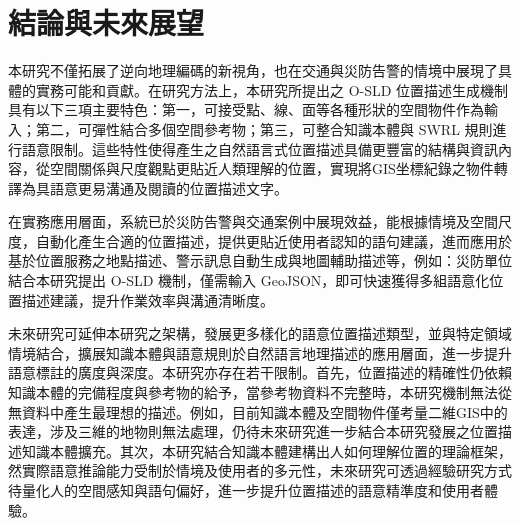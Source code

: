
\chapter{結論與未來展望}

本研究不僅拓展了逆向地理編碼的新視角，也在交通與災防告警的情境中展現了具體的實務可能和貢獻。在研究方法上，本研究所提出之 O-SLD 位置描述生成機制具有以下三項主要特色：第一，可接受點、線、面等各種形狀的空間物件作為輸入；第二，可彈性結合多個空間參考物；第三，可整合知識本體與 SWRL 規則進行語意限制。這些特性使得產生之自然語言式位置描述具備更豐富的結構與資訊內容，從空間關係與尺度觀點更貼近人類理解的位置，實現將GIS坐標紀錄之物件轉譯為具語意更易溝通及閱讀的位置描述文字。

在實務應用層面，系統已於災防告警與交通案例中展現效益，能根據情境及空間尺度，自動化產生合適的位置描述，提供更貼近使用者認知的語句建議，進而應用於基於位置服務之地點描述、警示訊息自動生成與地圖輔助描述等，例如：災防單位結合本研究提出 O-SLD 機制，僅需輸入 GeoJSON，即可快速獲得多組語意化位置描述建議，提升作業效率與溝通清晰度。

未來研究可延伸本研究之架構，發展更多樣化的語意位置描述類型，並與特定領域情境結合，擴展知識本體與語意規則於自然語言地理描述的應用層面，進一步提升語意標註的廣度與深度。本研究亦存在若干限制。首先，位置描述的精確性仍依賴知識本體的完備程度與參考物的給予，當參考物資料不完整時，本研究機制無法從無資料中產生最理想的描述。例如，目前知識本體及空間物件僅考量二維GIS中的表達，涉及三維的地物則無法處理，仍待未來研究進一步結合本研究發展之位置描述知識本體擴充。其次，本研究結合知識本體建構出人如何理解位置的理論框架，然實際語意推論能力受制於情境及使用者的多元性，未來研究可透過經驗研究方式待量化人的空間感知與語句偏好，進一步提升位置描述的語意精準度和使用者體驗。
